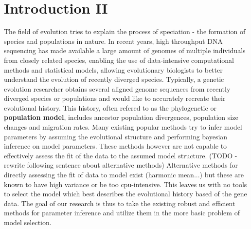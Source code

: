 \documentclass[11pt]{article}
\newcommand{\1}{\mathbbm{1}}
\begin{document}
\newpage

\tableofcontents

\newpage
















\section{Introduction II}

The field of evolution tries to explain the process of speciation - the formation of species and populations in nature.
%
In recent years,  high throughput DNA sequencing has made available a large amount of genomes of multiple individuals from closely related species, enabling the use of data-intensive computational methods and statistical models, allowing evolutionary biologists to better understand the evolution of recently diverged species.
%
Typically, a genetic evolution researcher obtains several aligned genome sequences from recently diverged species or populations and would like to accurately recreate their evolutional history. This history, often refered to as the phylogenetic or \textbf{population model}, includes ancestor population divergences, population size changes and migration rates.
%
Many existing popular methods try to infer model parameters by assuming the evolutional structure  and performing bayesian inference on model parameters. These methods however are not capable to effectively assess the fit of the data to the assumed model structure.
%
(TODO - rewrite following sentence about alternative methods) Alternative methods for directly assessing the fit of data to model exist (harmonic mean...) but these are known to have high variance or be too cpu-intensive.
%
This leaves us with no tools to select the model which best describes the evolutional history based of the gene data.
%
The goal of our research is thus to take the existing robust and efficient methods for parameter inference and utilize them in the more basic problem of model selection.
%
\end{document}
